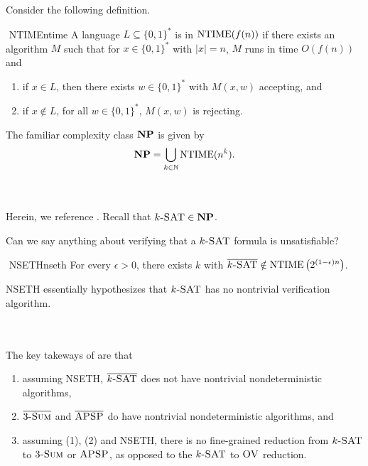         Consider the following definition.
        \begin{definition}{\Stop\,\,NTIME}{ntime}
            A language \(L\subseteq\{0,1\}^*\) is in \(\NTIME(f(n))\) if there exists an algorithm \(M\) such that for \(x\in\{0,1\}^*\) with \(|x|=n\), \(M\) runs in time \(O(f(n))\) and
            \begin{enumerate}
                \item if \(x\in L\), then there exists \(w\in\{0,1\}^*\) with \(M(x,w)\) accepting, and
                \item if \(x\nin L\), for all \(w\in\{0,1\}^*\), \(M(x,w)\) is rejecting.
            \end{enumerate}
        \end{definition}
        \begin{remark*}
            The familiar complexity class \(\com{NP}\) is given by
            \begin{equation*}
                \com{NP}=\bigcup_{k\in\mathbb{N}}\NTIME(n^k).
            \end{equation*}
        \end{remark*}
        \vphantom
        \\
        \\
        Herein, we reference \cite{carmosino2016nseth}. Recall that \(k\textsc{-SAT}\in\com{NP}\).
        \begin{question*}
            Can we say anything about verifying that a \(k\textsc{-SAT}\) formula is unsatisfiable?
        \end{question*}
        \begin{hypothesis}{\Stop\,\,NSETH}{nseth}
            For every \(\epsilon>0\), there exists \(k\) with \(\bar{k\textsc{-SAT}}\nin\NTIME\left(2^{(1-\epsilon)n}\right)\).
        \end{hypothesis}
        \begin{remark*}
            NSETH essentially hypothesizes that \(k\textsc{-SAT}\) has no nontrivial verification algorithm.
        \end{remark*} 
        \vphantom
        \\
        \\
        The key takeways of \cite{carmosino2016nseth} are that
        \begin{enumerate}
            \item assuming NSETH, \(\bar{k\textsc{-SAT}}\) does not have nontrivial nondeterministic algorithms,
            \item \(\bar{3\textsc{-Sum}}\) and \(\bar{\textsc{APSP}}\) do have nontrivial nondeterministic algorithms, and
            \item assuming (1), (2) and NSETH, there is no fine-grained reduction from \(k\textsc{-SAT}\) to \(3\textsc{-Sum}\) or \(\textsc{APSP}\), as opposed to the \(k\textsc{-SAT}\) to \(\textsc{OV}\) reduction.
        \end{enumerate}
